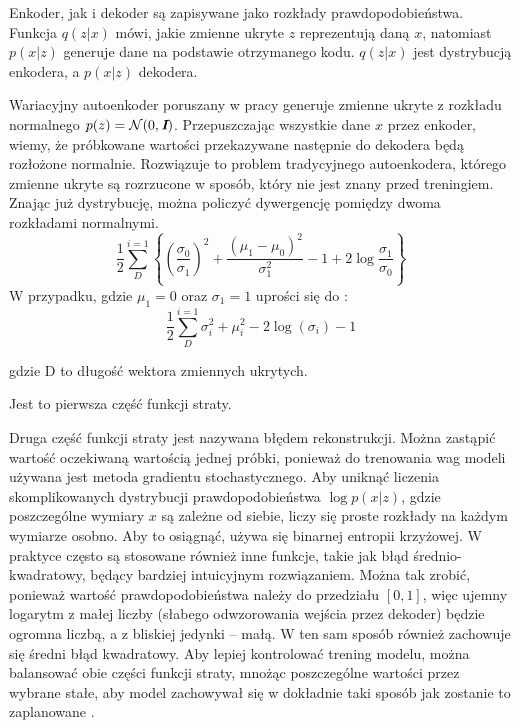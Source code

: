 \documentclass[a4paper,12pt,oneside]{book} %
\begin{document}
Enkoder, jak i dekoder są zapisywane jako rozkłady prawdopodobieństwa. Funkcja $q(z|x)$ mówi, jakie zmienne ukryte $z$ reprezentują daną $x$, natomiast $p(x|z)$ generuje dane na podstawie otrzymanego kodu. $q(z|x)$ jest dystrybucją enkodera, a $p(x|z)$ dekodera.

Wariacyjny autoenkoder poruszany w pracy generuje zmienne ukryte z rozkładu normalnego $p(z)=\mathcal{N}(0,\textit{\textbf{I}})$. Przepuszczając wszystkie dane $x$ przez enkoder, wiemy, że próbkowane wartości przekazywane następnie do dekodera będą rozłożone normalnie. Rozwiązuje to problem tradycyjnego autoenkodera, którego zmienne ukryte są rozrzucone w sposób, który nie jest znany przed treningiem. Znając już dystrybucję, można policzyć dywergencję pomiędzy dwoma rozkładami normalnymi.
\begin{equation}
	\dfrac{1}{2}\displaystyle\sum_{D}^{i=1}\left\{\left(\dfrac{\sigma_0}{\sigma_1}\right)^2+\dfrac{(\mu_1 - \mu_0)^2}{\sigma_1^2} - 1 + 2\log\dfrac{\sigma_1}{\sigma_0}\right\}
	\label{equ:kldnormals}
\end{equation}
W przypadku, gdzie $\mu_1 = 0$ oraz $\sigma_1=1$ uprości się do \cite{kingma2014autoencoding}:
\begin{equation}
	\dfrac{1}{2}\displaystyle\sum_{D}^{i=1}\sigma_i^2+\mu_i^2-2\log(\sigma_i)-1
	\label{equ:kld_loss}
\end{equation} 
\begin{center}
	gdzie D to długość wektora zmiennych ukrytych.
\end{center}
Jest to pierwsza część funkcji straty. 

Druga część funkcji straty jest nazywana błędem rekonstrukcji. Można zastąpić wartość oczekiwaną wartością jednej próbki, ponieważ do trenowania wag modeli używana jest metoda gradientu stochastycznego. Aby uniknąć liczenia skomplikowanych dystrybucji prawdopodobieństwa $\log p(x|z)$, gdzie poszczególne wymiary $x$ są zależne od siebie, liczy się proste rozkłady na każdym wymiarze osobno. Aby to osiągnąć, używa się binarnej entropii krzyżowej. W praktyce często są stosowane również inne funkcje, takie jak błąd średnio-kwadratowy, będący bardziej intuicyjnym rozwiązaniem.
Można tak zrobić, ponieważ wartość prawdopodobieństwa należy do przedziału $\left[ 0, 1\right] $, więc ujemny logarytm z małej liczby (słabego odwzorowania wejścia przez dekoder) będzie ogromna liczbą, a z bliskiej jedynki -- małą. W ten sam sposób również zachowuje się średni błąd kwadratowy. Aby lepiej kontrolować trening modelu, można balansować obie części funkcji straty, mnożąc poszczególne wartości przez wybrane stałe, aby model zachowywał się w dokładnie taki sposób jak zostanie to zaplanowane \cite{balancing}.
\end{document}
